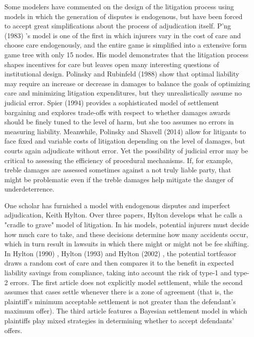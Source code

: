 \documentclass{article}
\begin{document}
Some modelers have commented on the design of the litigation process using models in which the generation of disputes is endogenous, but have been forced to accept great simplifications about the process of adjudication itself. P'ng (1983) \cite{png}'s model is one of the first in which injurers vary in the cost of care and choose care endogenously, and the entire game is simplified into a extensive form game tree with only 15 nodes. His model demonstrates that the litigation process shapes incentives for care but leaves open many interesting questions of institutional design. Polinsky and Rubinfeld (1988) \cite{polinskyrubinfeld1988} show that optimal liability may require an increase or decrease in damages to balance the goals of optimizing care and minimizing litigation expenditures, but they unrealistically assume no judicial error. Spier (1994) \cite{spier} provides a sophisticated model of settlement bargaining and explores trade-offs with respect to whether damages awards should be finely tuned to the level of harm, but she too assumes no errors in measuring liability. Meanwhile, Polinsky and Shavell (2014) \cite{polinskyshavell2014} allow for litigants to face fixed and variable costs of litigation depending on the level of damages, but courts again adjudicate without error. Yet the possibility of judicial error may be critical to assessing the efficiency of procedural mechanisms. If, for example, treble damages are assessed sometimes against a not truly liable party, that might be problematic even if the treble damages help mitigate the danger of underdeterrence. 

One scholar has furnished a model with endogenous disputes and imperfect adjudication, Keith Hylton. Over three papers, Hylton develops what he calls a "cradle to grave" model of litigation. In his models, potential injurers must decide how much care to take, and these decisions determine how many accidents occur, which in turn result in lawsuits in which there might or might not be fee shifting. In Hylton (1990) \cite{hylton1990}, Hylton (1993) \cite{hylton1993} and Hylton (2002) \cite{hylton2002}, the potential tortfeasor draws a random cost of care and then compares it to the benefit in expected liability savings from compliance, taking into account the risk of type-1 and type-2 errors. The first article does not explicitly model settlement, while the second assumes that cases settle whenever there is a zone of agreement (that is, the plaintiff's minimum acceptable settlement is not greater than the defendant's maximum offer). The third article features a Bayesian settlement model in which plaintiffs play mixed strategies in determining whether to accept defendants' offers.  
\end{document}
